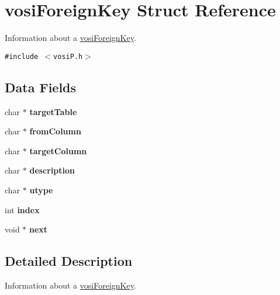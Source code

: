 \hypertarget{structvosiForeignKey}{
\section{vosiForeignKey Struct Reference}
\label{structvosiForeignKey}
}
Information about a \hyperlink{structvosiForeignKey}{vosiForeignKey}.  


{\tt \#include $<$vosiP.h$>$}

\subsection*{Data Fields}
\begin{CompactItemize}
\item 
\hypertarget{structvosiForeignKey_ba4a2fb4c958824143301b77bee57fa5}{
char $\ast$ \textbf{targetTable}}
\label{structvosiForeignKey_ba4a2fb4c958824143301b77bee57fa5}

\item 
\hypertarget{structvosiForeignKey_b7f22ca86f540448b7fc799558344d93}{
char $\ast$ \textbf{fromColumn}}
\label{structvosiForeignKey_b7f22ca86f540448b7fc799558344d93}

\item 
\hypertarget{structvosiForeignKey_9e71adc9eae4d3952722fc6af0340b87}{
char $\ast$ \textbf{targetColumn}}
\label{structvosiForeignKey_9e71adc9eae4d3952722fc6af0340b87}

\item 
\hypertarget{structvosiForeignKey_5cf90802d185f56a67fc34f43616d7f6}{
char $\ast$ \textbf{description}}
\label{structvosiForeignKey_5cf90802d185f56a67fc34f43616d7f6}

\item 
\hypertarget{structvosiForeignKey_1911e5f78044cd83dd1a9c32499be77e}{
char $\ast$ \textbf{utype}}
\label{structvosiForeignKey_1911e5f78044cd83dd1a9c32499be77e}

\item 
\hypertarget{structvosiForeignKey_824ea95c4ee3e4df0b168ca529530792}{
int \textbf{index}}
\label{structvosiForeignKey_824ea95c4ee3e4df0b168ca529530792}

\item 
\hypertarget{structvosiForeignKey_d7f6697094bae1d5335867542bcbe9fb}{
void $\ast$ \textbf{next}}
\label{structvosiForeignKey_d7f6697094bae1d5335867542bcbe9fb}

\end{CompactItemize}


\subsection{Detailed Description}
Information about a \hyperlink{structvosiForeignKey}{vosiForeignKey}. 

